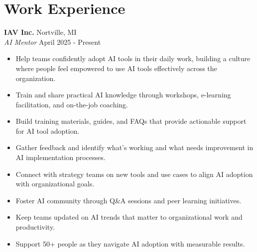 \section*{Work Experience}

\noindent
\textbf{IAV Inc.} \hfill Nortville, MI \\
\textit{AI Mentor} \hfill April 2025 - Present \\
\begin{itemize}[leftmargin=*,noitemsep,topsep=3pt]
    \item Help teams confidently adopt AI tools in their daily work, building a culture where people feel empowered to use AI tools effectively across the organization.
    \item Train and share practical AI knowledge through workshops, e-learning facilitation, and on-the-job coaching.
    \item Build training materials, guides, and FAQs that provide actionable support for AI tool adoption.
    \item Gather feedback and identify what's working and what needs improvement in AI implementation processes.
    \item Connect with strategy teams on new tools and use cases to align AI adoption with organizational goals.
    \item Foster AI community through Q\&A sessions and peer learning initiatives.
    \item Keep teams updated on AI trends that matter to organizational work and productivity.
    \item Support 50+ people as they navigate AI adoption with measurable results.
\end{itemize}

\vspace{0.5em}


